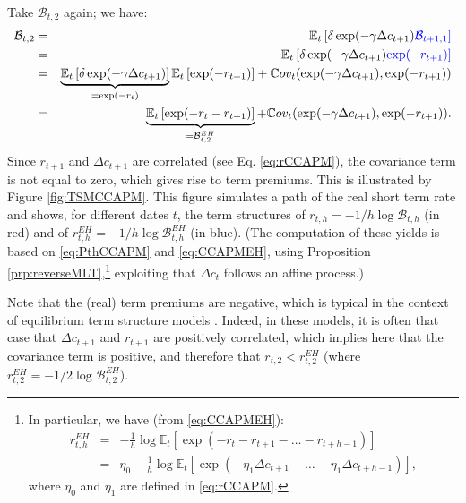 \documentclass[
  12pt,
]{book}
\theoremstyle{definition}
\theoremstyle{definition}
\theoremstyle{definition}
\theoremstyle{definition}
\theoremstyle{remark}
\begin{document}
Take \(\mathcal{B}_{t,2}\) again; we have:
\begin{eqnarray*}
\mathcal{B}_{t,2} &=&  \mathbb{E}_t \left[ \delta \exp(-\gamma \Delta c_{t+1}) \color{blue}{\mathcal{B}_{t+1,1}} \right]\\
&=& \mathbb{E}_t \left[ \delta \exp(-\gamma \Delta c_{t+1}) \color{blue}{\exp(- r_{t+1})}\right]\\
&=& \underbrace{\mathbb{E}_t \left[ \delta \exp(-\gamma \Delta c_{t+1}) \right]}_{=\exp(-r_{t})}\mathbb{E}_t \left[ \exp(- r_{t+1}) \right] + \mathbb{C}ov_t(\exp(-\gamma \Delta c_{t+1}),\exp(- r_{t+1}))\\
&=& \underbrace{\mathbb{E}_t \left[ \exp(- r_{t}- r_{t+1}) \right]}_{= \mathcal{B}^{EH}_{t,2}} + \mathbb{C}ov_t(\exp(-\gamma \Delta c_{t+1}),\exp(- r_{t+1})).
\end{eqnarray*}
Since \(r_{t+1}\) and \(\Delta c_{t+1}\) are correlated (see Eq. \eqref{eq:rCCAPM}), the covariance term is not equal to zero, which gives rise to term premiums. This is illustrated by Figure \ref{fig:TSMCCAPM}. This figure simulates a path of the real short term rate and shows, for different dates \(t\), the term structures of \(r_{t,h} = -1/h \log \mathcal{B}_{t,h}\) (in red) and of \(r_{t,h}^{EH}= -1/h \log \mathcal{B}^{EH}_{t,h}\) (in blue). (The computation of these yields is based on \eqref{eq:PthCCAPM} and \eqref{eq:CCAPMEH}, using Proposition \ref{prp:reverseMLT},\footnote{In particular, we have (from \eqref{eq:CCAPMEH}):
  \begin{eqnarray}
  r^{EH}_{t,h} &=& -\frac{1}{h} \log \mathbb{E}_t \left[ \exp(- r_{t} - r_{t+1} - \dots - r_{t+h-1}) \right] \\
  &=& \eta_0 -\frac{1}{h} \log \mathbb{E}_t \left[ \exp(  - \eta_1 \Delta c_{t+1} - \dots - \eta_1 \Delta c_{t+h-1}) \right],
  \end{eqnarray}
  where \(\eta_0\) and \(\eta_1\) are defined in \eqref{eq:rCCAPM}.} exploiting that \(\Delta c_t\) follows an affine process.)

Note that the (real) term premiums are negative, which is typical in the context of equilibrium term structure models \citep{Piazzesi_Schneider_2007}. Indeed, in these models, it is often that case that \(\Delta c_{t+1}\) and \(r_{t+1}\) are positively correlated, which implies here that the covariance term is positive, and therefore that \(r_{t,2} < r_{t,2}^{EH}\) (where \(r_{t,2}^{EH} = -1/2 \log \mathcal{B}^{EH}_{t,2}\)).
\end{document}
